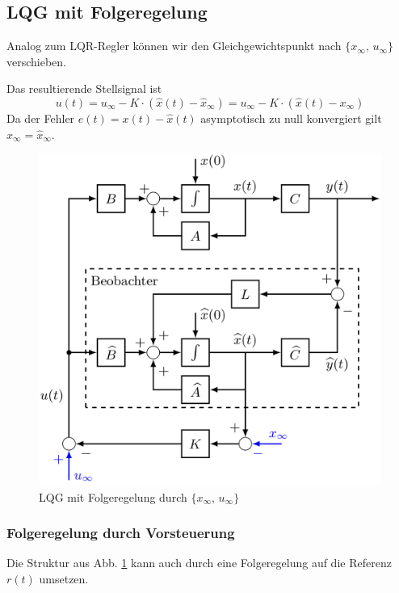 \subsection{LQG mit Folgeregelung}
    Analog zum LQR-Regler können wir den Gleichgewichtspunkt nach $\{x_\infty,\, u_\infty\}$ verschieben.
    
    Das resultierende Stellsignal ist
    \begin{equation*}
        u(t) = u_\infty - K\cdot(\widehat{x}(t)-\widehat{x}_\infty) = u_\infty - K\cdot(\widehat{x}(t)-x_\infty)
    \end{equation*}
    Da der Fehler $e(t)= x(t)-\widehat{x}(t)$ asymptotisch zu null konvergiert gilt $x_\infty = \widehat{x}_\infty$.
    
    \begin{figure}[H]
        \centering
        \includegraphics[width = 0.6\linewidth]{images/10/LQG_Folg.jpeg}
        \caption{LQG mit Folgeregelung durch $\{x_\infty,\, u_\infty\}$}
        \label{fig:lqgfolgeregelung}
    \end{figure}
    
    \subsubsection{Folgeregelung durch Vorsteuerung} \label{s:LQGIFolgeregelung}
        Die Struktur aus Abb. \ref{fig:lqgfolgeregelung} kann auch durch eine Folgeregelung auf die Referenz $r(t)$ umsetzen. 
        
